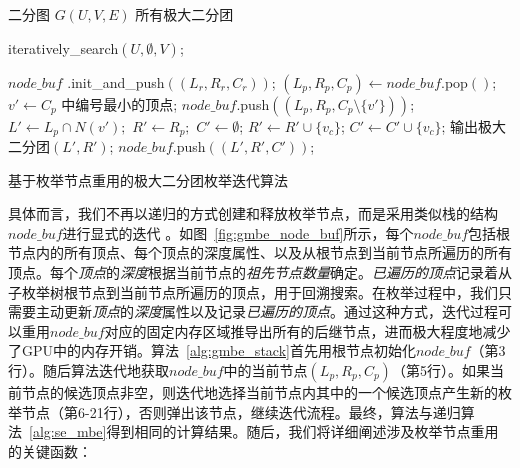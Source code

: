 \begin{algorithm} [H]
  \begin{algorithmic}[1]
    \normalsize
    \REQUIRE 二分图 $G(U,V,E)$
    \ENSURE 所有极大二分团
    
    \renewcommand{\algorithmicwhile}{\textbf{procedure}}
    \renewcommand{\algorithmicdo}{\textbf{:}}
    \STATE \textsf{iteratively\_search}$(U,\emptyset,V)$;

    \renewcommand{\algorithmicwhile}{\textbf{while}}
    \renewcommand{\algorithmicdo}{\textbf{do}}
      \STATE $node\_buf$ \textsf{.init\_and\_push}$((L_r,R_r,C_r))$;
        \STATE $(L_p, R_p, C_p) \leftarrow node\_buf$\textsf{.pop}$()$;
          \STATE $v' \leftarrow C_p$ 中编号最小的顶点; 
          \STATE $node\_buf$\textsf{.push}$((L_p,R_p,C_p \setminus \{v'\} ))$;
          \STATE $L' \leftarrow L_p \cap N(v');$ $R'\leftarrow R_p;$ $C' \leftarrow \emptyset$;
              \STATE $R' \leftarrow R' \cup \{v_c\}$;
              \STATE $C' \leftarrow C' \cup \{v_c\}$;
            \ENDIF
          \ENDFOR
            \STATE 输出极大二分团$(L', R')$;
            \STATE $node\_buf$\textsf{.push}$((L',R',C'))$;
          \ENDIF
        \ENDIF
        
      \ENDWHILE
    \ENDWHILE

  \end{algorithmic}
  \caption{基于枚举节点重用的极大二分团枚举迭代算法}
  \label{alg:gmbe_stack}
\end{algorithm}


具体而言，我们不再以递归的方式创建和释放枚举节点，而是采用类似栈的结构$node\_buf$进行显式的迭代 。如图~\ref{fig:gmbe_node_buf}所示，每个$node\_buf$包括根节点内的所有顶点、每个顶点的深度属性、以及从根节点到当前节点所遍历的所有顶点。每个\textit{顶点}的\emph{\textit{深度}}根据当前节点的\emph{祖先节点数量}确定。\textit{已遍历的顶点}记录着从子枚举树根节点到当前节点所遍历的顶点，用于回溯搜索。在枚举过程中，我们只需要主动更新\textit{顶点}的\textit{深度}属性以及记录\textit{已遍历的顶点}。通过这种方式，迭代过程可以重用$node\_buf$对应的固定内存区域推导出所有的后继节点，进而极大程度地减少了GPU中的内存开销。算法~\ref{alg:gmbe_stack}首先用根节点初始化$node\_buf$（第3行）。随后算法迭代地获取$node\_buf$中的当前节点$(L_p,R_p,C_p)$（第5行）。如果当前节点的候选顶点非空，则迭代地选择当前节点内其中的一个候选顶点产生新的枚举节点（第6-21行），否则弹出该节点，继续迭代流程。最终，算法与递归算法~\ref{alg:se_mbe}得到相同的计算结果。随后，我们将详细阐述涉及枚举节点重用的关键函数：


